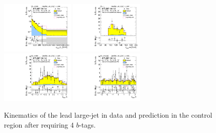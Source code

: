 \begin{figure}[htbp!]
\begin{center}
\includegraphics[width=0.32\textwidth,angle=-90]{figures/boosted/Control/b77_FourTag_Control_leadHCand_Pt_m_1.pdf}
\includegraphics[width=0.32\textwidth,angle=-90]{figures/boosted/Control/b77_FourTag_Control_leadHCand_Mass_s.pdf}\\
\includegraphics[width=0.32\textwidth,angle=-90]{figures/boosted/Control/b77_FourTag_Control_leadHCand_Eta.pdf}
\includegraphics[width=0.32\textwidth,angle=-90]{figures/boosted/Control/b77_FourTag_Control_leadHCand_Phi.pdf}
  \caption{Kinematics of the lead large-\R jet in data and prediction in the control region after requiring 4 $b$-tags. }
  \label{fig:boosted-4b-control-ak10-lead}
\end{center}
\end{figure}

